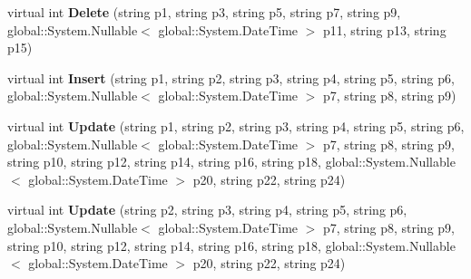 \begin{DoxyCompactItemize}
\item 
virtual int {\bfseries Delete} (string p1, string p3, string p5, string p7, string p9, global\+::\+System.\+Nullable$<$ global\+::\+System.\+Date\+Time $>$ p11, string p13, string p15)\hypertarget{class_products_1_1_data_1_1ds_sage_table_adapters_1_1ta_kundensoftware_a5d846f44bfebec662be7d650ff106543}{}\label{class_products_1_1_data_1_1ds_sage_table_adapters_1_1ta_kundensoftware_a5d846f44bfebec662be7d650ff106543}

\item 
virtual int {\bfseries Insert} (string p1, string p2, string p3, string p4, string p5, string p6, global\+::\+System.\+Nullable$<$ global\+::\+System.\+Date\+Time $>$ p7, string p8, string p9)\hypertarget{class_products_1_1_data_1_1ds_sage_table_adapters_1_1ta_kundensoftware_aea3a6a87f8357066f004a9ce155e3795}{}\label{class_products_1_1_data_1_1ds_sage_table_adapters_1_1ta_kundensoftware_aea3a6a87f8357066f004a9ce155e3795}

\item 
virtual int {\bfseries Update} (string p1, string p2, string p3, string p4, string p5, string p6, global\+::\+System.\+Nullable$<$ global\+::\+System.\+Date\+Time $>$ p7, string p8, string p9, string p10, string p12, string p14, string p16, string p18, global\+::\+System.\+Nullable$<$ global\+::\+System.\+Date\+Time $>$ p20, string p22, string p24)\hypertarget{class_products_1_1_data_1_1ds_sage_table_adapters_1_1ta_kundensoftware_a4ea42b34a0bea9b756c25fd387da8a56}{}\label{class_products_1_1_data_1_1ds_sage_table_adapters_1_1ta_kundensoftware_a4ea42b34a0bea9b756c25fd387da8a56}

\item 
virtual int {\bfseries Update} (string p2, string p3, string p4, string p5, string p6, global\+::\+System.\+Nullable$<$ global\+::\+System.\+Date\+Time $>$ p7, string p8, string p9, string p10, string p12, string p14, string p16, string p18, global\+::\+System.\+Nullable$<$ global\+::\+System.\+Date\+Time $>$ p20, string p22, string p24)\hypertarget{class_products_1_1_data_1_1ds_sage_table_adapters_1_1ta_kundensoftware_ad32f69da4ef30db145c73bdb0e94103b}{}\label{class_products_1_1_data_1_1ds_sage_table_adapters_1_1ta_kundensoftware_ad32f69da4ef30db145c73bdb0e94103b}

\end{DoxyCompactItemize}
